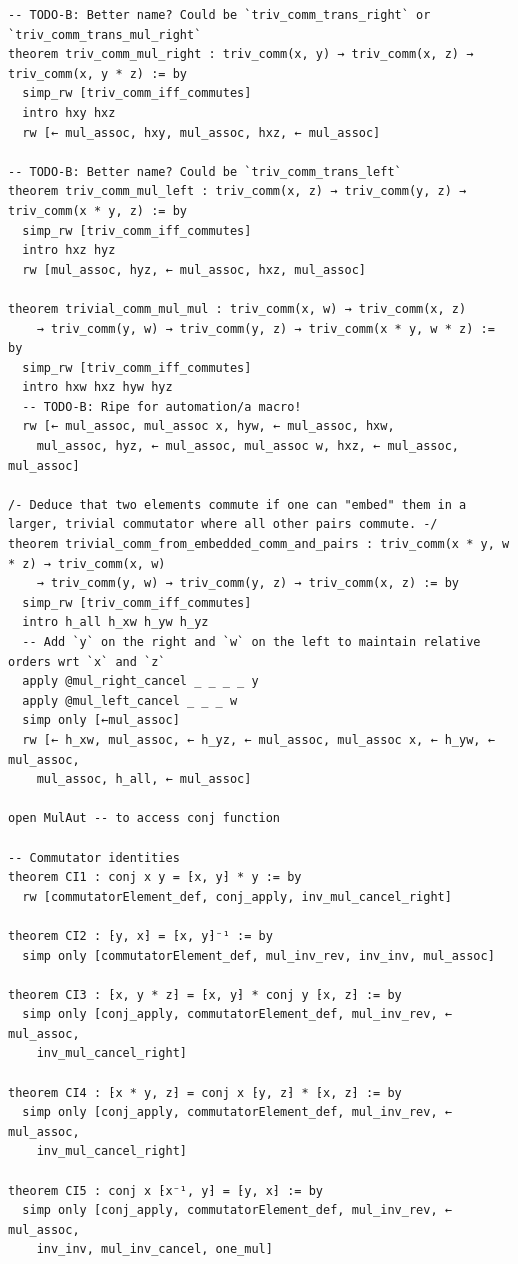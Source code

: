 \begin{Verbatim}
-- TODO-B: Better name? Could be `triv_comm_trans_right` or `triv_comm_trans_mul_right`
theorem triv_comm_mul_right : triv_comm(x, y) → triv_comm(x, z) → triv_comm(x, y * z) := by
  simp_rw [triv_comm_iff_commutes]
  intro hxy hxz
  rw [← mul_assoc, hxy, mul_assoc, hxz, ← mul_assoc]

-- TODO-B: Better name? Could be `triv_comm_trans_left`
theorem triv_comm_mul_left : triv_comm(x, z) → triv_comm(y, z) → triv_comm(x * y, z) := by
  simp_rw [triv_comm_iff_commutes]
  intro hxz hyz
  rw [mul_assoc, hyz, ← mul_assoc, hxz, mul_assoc]

theorem trivial_comm_mul_mul : triv_comm(x, w) → triv_comm(x, z)
    → triv_comm(y, w) → triv_comm(y, z) → triv_comm(x * y, w * z) := by
  simp_rw [triv_comm_iff_commutes]
  intro hxw hxz hyw hyz
  -- TODO-B: Ripe for automation/a macro!
  rw [← mul_assoc, mul_assoc x, hyw, ← mul_assoc, hxw,
    mul_assoc, hyz, ← mul_assoc, mul_assoc w, hxz, ← mul_assoc, mul_assoc]

/- Deduce that two elements commute if one can "embed" them in a larger, trivial commutator where all other pairs commute. -/
theorem trivial_comm_from_embedded_comm_and_pairs : triv_comm(x * y, w * z) → triv_comm(x, w)
    → triv_comm(y, w) → triv_comm(y, z) → triv_comm(x, z) := by
  simp_rw [triv_comm_iff_commutes]
  intro h_all h_xw h_yw h_yz
  -- Add `y` on the right and `w` on the left to maintain relative orders wrt `x` and `z`
  apply @mul_right_cancel _ _ _ _ y
  apply @mul_left_cancel _ _ _ w
  simp only [←mul_assoc]
  rw [← h_xw, mul_assoc, ← h_yz, ← mul_assoc, mul_assoc x, ← h_yw, ← mul_assoc,
    mul_assoc, h_all, ← mul_assoc]

open MulAut -- to access conj function

-- Commutator identities
theorem CI1 : conj x y = ⁅x, y⁆ * y := by
  rw [commutatorElement_def, conj_apply, inv_mul_cancel_right]

theorem CI2 : ⁅y, x⁆ = ⁅x, y⁆⁻¹ := by
  simp only [commutatorElement_def, mul_inv_rev, inv_inv, mul_assoc]

theorem CI3 : ⁅x, y * z⁆ = ⁅x, y⁆ * conj y ⁅x, z⁆ := by
  simp only [conj_apply, commutatorElement_def, mul_inv_rev, ← mul_assoc,
    inv_mul_cancel_right]

theorem CI4 : ⁅x * y, z⁆ = conj x ⁅y, z⁆ * ⁅x, z⁆ := by
  simp only [conj_apply, commutatorElement_def, mul_inv_rev, ← mul_assoc,
    inv_mul_cancel_right]

theorem CI5 : conj x ⁅x⁻¹, y⁆ = ⁅y, x⁆ := by
  simp only [conj_apply, commutatorElement_def, mul_inv_rev, ← mul_assoc,
    inv_inv, mul_inv_cancel, one_mul]


\end{Verbatim}
